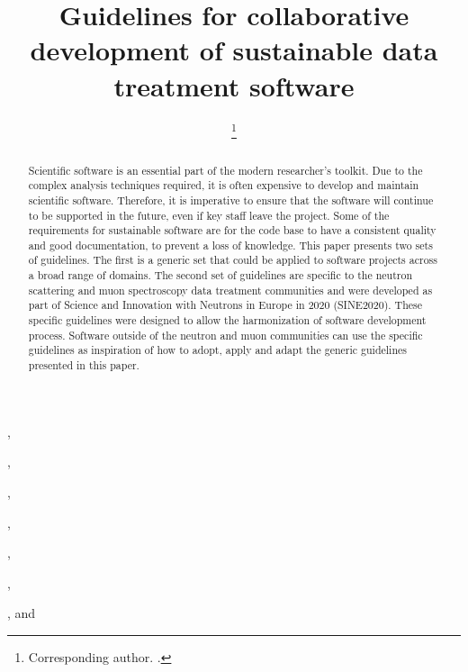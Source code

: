 \documentclass[jnr]{iosart2x}
\begin{document}
\begin{frontmatter}

\title{Guidelines for collaborative development of sustainable data treatment software}

\author[A]{ %
\thanks{Corresponding author. .}},
\author[A]{ },
\author[C]{ },
\author[D]{ },
\author[A]{ },
\author[E]{ },
\author[A]{ },
and
\author[B]{ }

\address[A]{,}
\address[B]{,}
\address[C]{,}
\address[D]{,}
\address[E]{,}

\begin{abstract}
Scientific software is an essential part of the modern researcher's toolkit.
Due to the complex analysis techniques required, it is often expensive to develop and maintain scientific software.
Therefore, it is imperative to ensure that the software will continue to be supported in the future, even if key staff leave the project.
Some of the requirements for sustainable software are for the code base to have a consistent quality and good documentation, to prevent a loss of knowledge.
This paper presents two sets of guidelines.
The first is a generic set that could be applied to software projects across a broad range of domains.
The second set of guidelines are specific to the neutron scattering and muon spectroscopy data treatment communities and were developed as part of Science and Innovation with Neutrons in Europe in 2020 (SINE2020).
These specific guidelines were designed to allow the harmonization of software development process.
Software outside of the neutron and muon communities can use the specific guidelines as inspiration of how to adopt, apply and adapt the generic guidelines presented in this paper.
\end{abstract}


\end{frontmatter}
\end{document}
